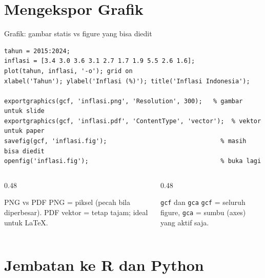 \documentclass[10pt,aspectratio=169]{beamer}
\newcommand{\kode}[1]{\texttt{\small #1}}
\begin{document}
\section{Mengekspor Grafik}

\begin{frame}[fragile]{Grafik: gambar statis vs figure yang bisa diedit}
\begin{lstlisting}
tahun = 2015:2024;
inflasi = [3.4 3.0 3.6 3.1 2.7 1.7 1.9 5.5 2.6 1.6];
plot(tahun, inflasi, '-o'); grid on
xlabel('Tahun'); ylabel('Inflasi (%)'); title('Inflasi Indonesia');

exportgraphics(gcf, 'inflasi.png', 'Resolution', 300);   % gambar untuk slide
exportgraphics(gcf, 'inflasi.pdf', 'ContentType', 'vector');  % vektor untuk paper
savefig(gcf, 'inflasi.fig');                               % masih bisa diedit
openfig('inflasi.fig');                                    % buka lagi
\end{lstlisting}
  \begin{columns}[T]
    \begin{column}{0.48\textwidth}
      \begin{block}{PNG vs PDF}
        \small PNG = piksel (pecah bila diperbesar). PDF vektor = tetap tajam; ideal untuk LaTeX.
      \end{block}
    \end{column}
    \begin{column}{0.48\textwidth}
      \begin{block}{\kode{gcf} dan \kode{gca}}
        \small \kode{gcf} = seluruh figure, \kode{gca} = sumbu (axes) yang aktif saja.
      \end{block}
    \end{column}
  \end{columns}
\end{frame}

\section{Jembatan ke R dan Python}
\end{document}
